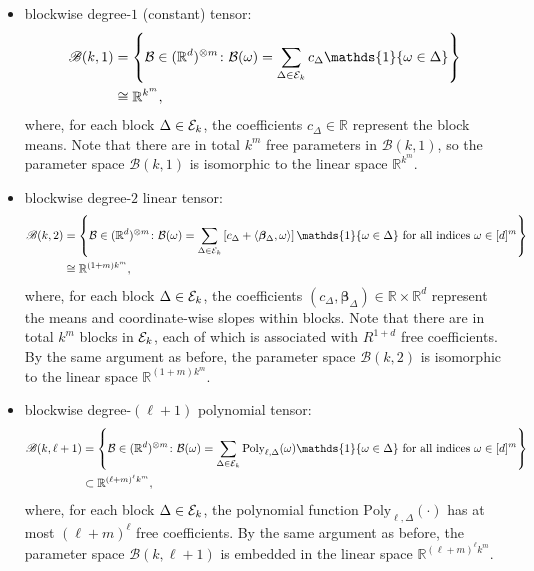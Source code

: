 \documentclass[11pt]{article}
\theoremstyle{definition}
\def\caliB{\mathscr{B}}
\begin{document}
 
\begin{itemize}
\item blockwise degree-$1$ (constant) tensor:
\begin{align}
\caliB(k,1)
&=\left\{\tB\in(\mathbb{R}^{d})^{\otimes m}\colon \tB(\omega)= \sum_{\Delta \in\tE_k}c_{\Delta}\mathds{1}\{\omega\in \Delta\} \right\}\\
&\cong \mathbb{R}^{k^m},
\end{align}
where, for each block $\Delta\in\mathcal{E}_k$, the coefficients $c_{\Delta}\in\mathbb{R}$ represent the block means. Note that there are in total $k^m$ free parameters in $\caliB(k,1)$, so the parameter space $\caliB(k,1)$ is isomorphic to the linear space $\mathbb{R}^{k^m}$.

\item blockwise degree-$2$ linear tensor:
\begin{align}
\caliB(k,2)&=\left\{\tB\in (\mathbb{R}^d)^{\otimes m}\colon \tB(\omega)=\sum_{\Delta \in \tE_k} \left[c_{\Delta}+\langle \boldsymbol{\beta}_{\Delta}, \omega\rangle\right] \mathds{1}\{\omega\in \Delta\}\text{ for all indices $\omega\in[d]^m$}\right\}\\
&\cong\mathbb{R}^{(1+m)k^m}, 
\end{align}
where, for each block $\Delta\in \mathcal{E}_k$, the coefficients $(c_{\Delta}, \boldsymbol{\beta}_{\Delta}) \in \mathbb{R}\times \mathbb{R}^d$ represent the means and coordinate-wise slopes within blocks. Note that there are in total $k^m$ blocks in $\mathcal{E}_k$, each of which is associated with $R^{1+d}$ free coefficients. By the same argument as before, the parameter space $\caliB(k,2)$ is isomorphic to the linear space $\mathbb{R}^{(1+m) k^m}$.


\item blockwise degree-$(\ell+1)$ polynomial tensor:
\begin{align}
\caliB(k,\ell+1)&=\left\{\tB\in(\mathbb{R}^{d})^{\otimes m}\colon \tB(\omega)=\sum_{\Delta \in \tE_k} \text{Poly}_{\ell,\Delta}(\omega) \mathds{1}\{\omega\in\Delta \}\text{ for all indices $\omega\in[d]^m$}\right\}\\
&\subset \mathbb{R}^{(\ell+m)^\ell k^m},
\end{align}
where, for each block $\Delta\in\mathcal{E}_k$, the polynomial function $\text{Poly}_{\ell,\Delta}(\cdot)$ has at most $(\ell+m)^{\ell}$ free coefficients. By the same argument as before, the parameter space $\caliB(k,\ell+1)$ is embedded in the linear space $\mathbb{R}^{(\ell+m)^\ell k^m}$.
\end{itemize}
\end{document}
